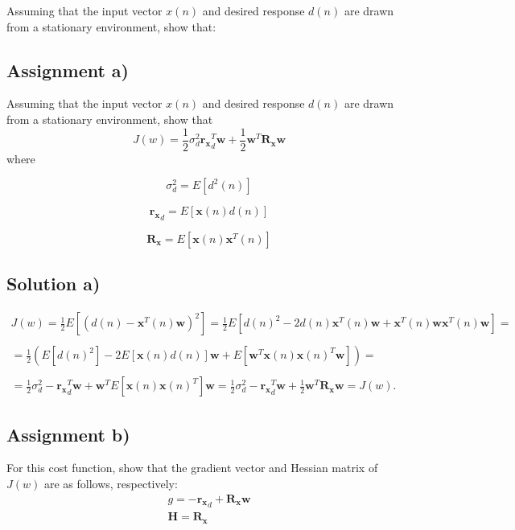 \documentclass[a4paper, 12pt]{article}
\begin{document}
Assuming that the input vector $x(n)$ and desired response $d(n)$ are drawn from a stationary environment, show that:


\subsection*{Assignment a)}
Assuming that the input vector $x(n)$ and desired response $d(n)$ are drawn from a stationary environment, show that
    \begin{equation*}
        J(w) = \frac{1}{2}\sigma^2_d\mathbf{r_x}_d^T\mathbf{w}+
        \frac{1}{2}\mathbf{w}^T\mathbf{R_x}\mathbf{w}
    \end{equation*}
    where

    \begin{equation*}
        \sigma_d^2 = E[d^2(n)]
    \end{equation*}


    \begin{equation*}
        \mathbf{r_x}_d = E[\mathbf{x}(n)d(n)]
    \end{equation*}

    \begin{equation*}
        \mathbf{R_x} = E[\mathbf{x}(n)\mathbf{x}^T(n)]
    \end{equation*}
\subsection*{Solution a)}


$$
\begin{array}{l}
J(w) = \frac{1}{2}E[(d(n) - \mathbf{x}^T(n)\mathbf{w})^2] = \frac{1}{2}E[d(n)^2 - 2 d(n)\mathbf{x}^T(n)\mathbf{w}+\mathbf{x}^T(n)\mathbf{w}\mathbf{x}^T(n)\mathbf{w}] = \\
\\
=\frac{1}{2}(E[d(n)^2] - 2E[\mathbf{x}(n)d(n)]\mathbf{w}+E[\mathbf{w}^T\mathbf{x}(n)\mathbf{x}(n)^T\mathbf{w}]) =\\
\\
=\frac{1}{2}\sigma_d^2 - \mathbf{r_x}_d^T\mathbf{w} + \mathbf{w}^T E[\mathbf{x}(n)\mathbf{x}(n)^T] \mathbf{w} = \frac{1}{2}\sigma_d^2 - \mathbf{r_x}_d^T\mathbf{w} +\frac{1}{2}\mathbf{w}^T \mathbf{R_x} \mathbf{w} = J(w).
\end{array}
$$

\subsection*{Assignment b)}
For this cost function, show that the gradient vector and Hessian matrix of $J(w)$ are as follows, respectively:
$$
\begin{array}{l}
   g = - \mathbf{r_x}_d +\mathbf{R_x}\mathbf{w}\\
   \mathbf{H} = \mathbf{R_x}
\end{array}
$$
\end{document}
